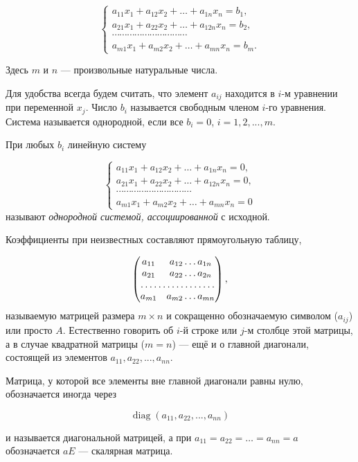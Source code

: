 \documentclass[12pt,english,russian]{article}
\DeclareMathOperator{\diag}{diag}
\begin{document}
	$$
		\begin{cases}
			a_{11}x_1 + a_{12}x_2 + \dots + a_{1n}x_n = b_1,\\
			a_{21}x_1 + a_{22}x_2 + \dots + a_{12n}x_n = b_2,\\
			\cdots \cdots \cdots \cdots \cdots \cdots \cdots \cdots \cdots \cdots\\
			a_{m1}x_1 + a_{m2}x_2 + \dots + a_{mn}x_n = b_m.
		\end{cases}
	$$

	Здесь $m$ и $n$ --- произвольные натуральные числа.

	Для удобства всегда будем считать, что элемент
	$a_{ij}$ находится в $i$-м уравнении при переменной $x_j$. 
	Число $b_i$ называется свободным членом $i$-го уравнения. Система называется
	однородной, если все $b_i = 0$, $i = 1, 2, . . . , m$.

	При любых $b_i$ линейную систему

	$$
		\begin{cases}
			a_{11}x_1 + a_{12}x_2 + \dots + a_{1n}x_n = 0,\\
			a_{21}x_1 + a_{22}x_2 + \dots + a_{12n}x_n = 0,\\
			\cdots \cdots \cdots \cdots \cdots \cdots \cdots \cdots \cdots \cdots\\
			a_{m1}x_1 + a_{m2}x_2 + \dots + a_{mn}x_n = 0
		\end{cases}
	$$
	называют
	\textit{однородной системой, ассоциированной}
	с исходной.

	Коэффициенты при неизвестных составляют прямоугольную
	таблицу,

	$$
			\begin{pmatrix}
				 a_{11} & a_{12} \dots a_{1n}\\
				 a_{21} & a_{22} \dots a_{2n}\\
				 \hdotsfor {2} \\
				 a_{m1} & a_{m2} \dots a_{mn}
			  \end{pmatrix},
	$$
	называемую матрицей размера $m \times n$ и сокращенно обозначаемую символом 
	($a_{ij}$) или просто $A$. Естественно говорить об $i$-й строке или $j$-м 
	столбце этой матрицы, а в случае квадратной матрицы ($m = n$) --- ещё и о главной диагонали, состоящей из
	элементов $a_{11}, a_{22}, . . . , a_{nn}$.

	Матрица, у которой все элементы вне главной диагонали равны
	нулю, обозначается иногда через

	$$\diag(a_{11}, a_{22}, . . . , a_{nn})$$

	и называется диагональной матрицей, а при $a_{11} = a_{22} = \dots = a_{nn} = a$
	обозначается $aE$ --- скалярная матрица.
\end{document}
